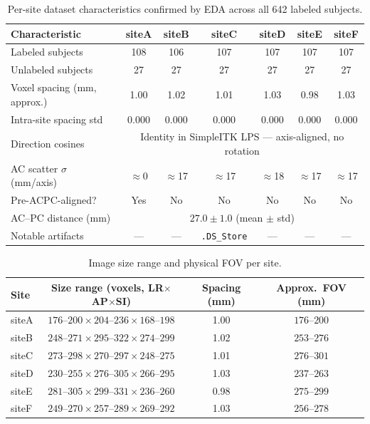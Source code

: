 \documentclass[11pt,letterpaper]{article}
\begin{document}
\begin{table}[h]
\centering
\caption{Per-site dataset characteristics confirmed by EDA across all 642 labeled subjects.}
\label{tab:sites}
\small
\begin{tabular}{lcccccc}
\toprule
\textbf{Characteristic} & \textbf{siteA} & \textbf{siteB} & \textbf{siteC}
                        & \textbf{siteD} & \textbf{siteE} & \textbf{siteF} \\
\midrule
Labeled subjects & 108 & 106 & 107 & 107 & 107 & 107 \\
Unlabeled subjects & 27 & 27 & 27 & 27 & 27 & 27 \\
Voxel spacing (mm, approx.) & 1.00 & 1.02 & 1.01 & 1.03 & 0.98 & 1.03 \\
Intra-site spacing std & 0.000 & 0.000 & 0.000 & 0.000 & 0.000 & 0.000 \\
Direction cosines & \multicolumn{6}{c}{Identity in SimpleITK LPS — axis-aligned, no rotation} \\
AC scatter $\sigma$ (mm/axis) & $\approx$0 & $\approx$17 & $\approx$17 & $\approx$18 & $\approx$17 & $\approx$17 \\
Pre-ACPC-aligned? & Yes & No & No & No & No & No \\
AC--PC distance (mm) & \multicolumn{6}{c}{$27.0 \pm 1.0$ (mean $\pm$ std)} \\
Notable artifacts & — & — & \texttt{.DS\_Store} & — & — & — \\
\bottomrule
\end{tabular}
\end{table}

\begin{table}[h]
\centering
\caption{Image size range and physical FOV per site.}
\label{tab:image_sizes}
\small
\begin{tabular}{lccc}
\toprule
\textbf{Site} & \textbf{Size range (voxels, LR$\times$AP$\times$SI)} & \textbf{Spacing (mm)} & \textbf{Approx.~FOV (mm)} \\
\midrule
siteA & $176$--$200 \times 204$--$236 \times 168$--$198$ & 1.00 & $176$--$200$ \\
siteB & $248$--$271 \times 295$--$322 \times 274$--$299$ & 1.02 & $253$--$276$ \\
siteC & $273$--$298 \times 270$--$297 \times 248$--$275$ & 1.01 & $276$--$301$ \\
siteD & $230$--$255 \times 276$--$305 \times 266$--$295$ & 1.03 & $237$--$263$ \\
siteE & $281$--$305 \times 299$--$331 \times 236$--$260$ & 0.98 & $275$--$299$ \\
siteF & $249$--$270 \times 257$--$289 \times 269$--$292$ & 1.03 & $256$--$278$ \\
\bottomrule
\end{tabular}
\end{table}
\end{document}
